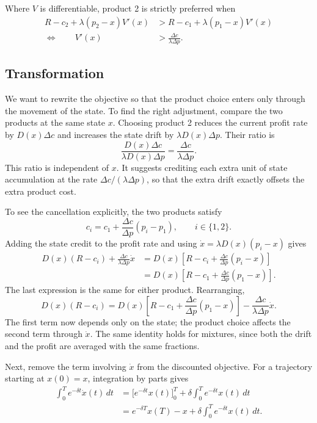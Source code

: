 \documentclass[11pt]{article}
\begin{document}
Where $V$ is differentiable, product 2 is strictly preferred when
\begin{align*}
R-c_2+\lambda(p_2-x)V'(x)
&>R-c_1+\lambda(p_1-x)V'(x)\\
\Longleftrightarrow\qquad V'(x)&>\frac{\Delta c}{\lambda\Delta p}.
\end{align*}



\subsection*{Transformation}
We want to rewrite the objective so that the product choice enters only
through the movement of the state. To find the right adjustment, compare
the two products at the same state $x$. Choosing product 2 reduces the
current profit rate by $D(x)\Delta c$ and increases the state drift by
$\lambda D(x)\Delta p$. Their ratio is
\begin{equation*}
\frac{D(x)\Delta c}{\lambda D(x)\Delta p}
=\frac{\Delta c}{\lambda\Delta p}.
\end{equation*}
This ratio is independent of $x$. It suggests crediting each extra unit
of state accumulation at the rate $\Delta c/(\lambda\Delta p)$, so that
the extra drift exactly offsets the extra product cost.

To see the cancellation explicitly, the two products satisfy
\begin{equation*}
c_i=c_1+\frac{\Delta c}{\Delta p}(p_i-p_1),
\qquad i\in\{1,2\}.
\end{equation*}
Adding the state credit to the profit rate and using
$\dot x=\lambda D(x)(p_i-x)$ gives
\begin{align*}
D(x)(R-c_i)+\frac{\Delta c}{\lambda\Delta p}\dot x
&=D(x)\left[R-c_i+\frac{\Delta c}{\Delta p}(p_i-x)\right]\\
&=D(x)\left[R-c_1+\frac{\Delta c}{\Delta p}(p_1-x)\right].
\end{align*}
The last expression is the same for either product. Rearranging,
\begin{equation*}
D(x)(R-c_i)
=D(x)\left[R-c_1+\frac{\Delta c}{\Delta p}(p_1-x)\right]
-\frac{\Delta c}{\lambda\Delta p}\dot x.
\end{equation*}
The first term now depends only on the state; the product choice affects
the second term through $\dot x$. The same identity holds for mixtures,
since both the drift and the profit are averaged with the same fractions.

Next, remove the term involving $\dot x$ from the discounted objective.
For a trajectory starting at $x(0)=x$, integration by parts gives
\begin{align*}
\int_0^T e^{-\delta t}\dot x(t)\,dt
&=\bigl[e^{-\delta t}x(t)\bigr]_0^T
+\delta\int_0^T e^{-\delta t}x(t)\,dt\\
&=e^{-\delta T}x(T)-x
+\delta\int_0^T e^{-\delta t}x(t)\,dt.
\end{align*}
\end{document}
